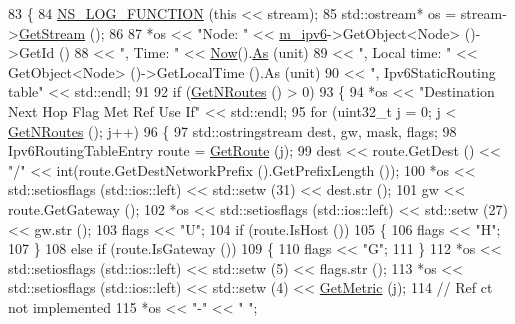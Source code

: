 \begin{DoxyCode}
83 \{
84   \hyperlink{log-macros-disabled_8h_a90b90d5bad1f39cb1b64923ea94c0761}{NS\_LOG\_FUNCTION} (\textcolor{keyword}{this} << stream);
85   std::ostream* os = stream->\hyperlink{classns3_1_1OutputStreamWrapper_a0cf30a4188ab6fdae2b2ab74db11acc2}{GetStream} ();
86 
87   *os << \textcolor{stringliteral}{"Node: "} << \hyperlink{classns3_1_1Ipv6StaticRouting_aeb0293ac3549a6ca0ba7674d35646fc8}{m\_ipv6}->GetObject<Node> ()->GetId ()
88       << \textcolor{stringliteral}{", Time: "} << \hyperlink{group__simulator_gac3635e2e87f7ce316c89290ee1b01d0d}{Now}().\hyperlink{classns3_1_1Time_a0bb1110638ce9938248bd07865a328ab}{As} (unit)
89       << \textcolor{stringliteral}{", Local time: "} << GetObject<Node> ()->GetLocalTime ().As (unit)
90       << \textcolor{stringliteral}{", Ipv6StaticRouting table"} << std::endl;
91 
92   \textcolor{keywordflow}{if} (\hyperlink{classns3_1_1Ipv6StaticRouting_a058db80420adcecf578861ac0baecd87}{GetNRoutes} () > 0)
93     \{
94       *os << \textcolor{stringliteral}{"Destination                    Next Hop                   Flag Met Ref Use If"} << std::endl;
95       \textcolor{keywordflow}{for} (uint32\_t j = 0; j < \hyperlink{classns3_1_1Ipv6StaticRouting_a058db80420adcecf578861ac0baecd87}{GetNRoutes} (); j++)
96         \{
97           std::ostringstream dest, gw, mask, flags;
98           Ipv6RoutingTableEntry route = \hyperlink{classns3_1_1Ipv6StaticRouting_a3393aa35fbb0d409c78a6cb2d1bce96a}{GetRoute} (j);
99           dest << route.GetDest () << \textcolor{stringliteral}{"/"} << int(route.GetDestNetworkPrefix ().GetPrefixLength ());
100           *os << std::setiosflags (std::ios::left) << std::setw (31) << dest.str ();
101           gw << route.GetGateway ();
102           *os << std::setiosflags (std::ios::left) << std::setw (27) << gw.str ();
103           flags << \textcolor{stringliteral}{"U"};
104           \textcolor{keywordflow}{if} (route.IsHost ())
105             \{
106               flags << \textcolor{stringliteral}{"H"};
107             \}
108           \textcolor{keywordflow}{else} \textcolor{keywordflow}{if} (route.IsGateway ())
109             \{
110               flags << \textcolor{stringliteral}{"G"};
111             \}
112           *os << std::setiosflags (std::ios::left) << std::setw (5) << flags.str ();
113           *os << std::setiosflags (std::ios::left) << std::setw (4) << \hyperlink{classns3_1_1Ipv6StaticRouting_adeb439c98a101186987e5780af6b1353}{GetMetric} (j);
114           \textcolor{comment}{// Ref ct not implemented}
115           *os << \textcolor{stringliteral}{"-"} << \textcolor{stringliteral}{"   "};

\end{DoxyCode}
